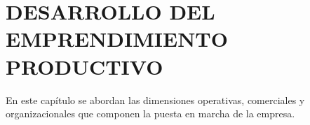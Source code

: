 \chapter{DESARROLLO DEL EMPRENDIMIENTO PRODUCTIVO}
\label{chap:desarrollo_emprendimiento}

En este capítulo se abordan las dimensiones operativas, comerciales y organizacionales que componen la puesta en marcha de la empresa.








